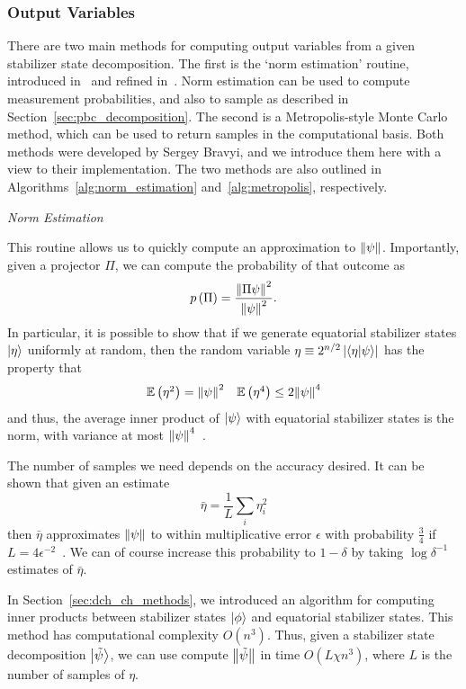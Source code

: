 \subsubsection*{Output Variables}
There are two main methods for computing output variables from a given stabilizer state decomposition. The first is the `norm estimation' routine, introduced in~\cite{Bravyi2016} and refined in~\cite{Bravyi2018}. Norm estimation can be used to compute measurement probabilities, and also to sample as described in Section~\ref{sec:pbc_decomposition}. The second is a Metropolis-style Monte Carlo method, which can be used to return samples in the computational basis. Both methods were developed by Sergey Bravyi, and we introduce them here with a view to their implementation. The two methods are also outlined in Algorithms~\ref{alg:norm_estimation} and~\ref{alg:metropolis}, respectively.\par
\large{\itshape{Norm Estimation}}\par
This routine allows us to quickly compute an approximation to $\norm{\psi}$. Importantly, given a projector $\Pi$, we can compute the probability of that outcome as
\begin{equation}
p\left(\Pi\right) = \frac{\norm{\Pi \psi}^{2}}{\norm{\psi}^{2}}.
\end{equation}
In particular, it is possible to show that if we generate equatorial stabilizer states $\ket{\eta}$ uniformly at random, then the random variable $\eta\equiv 2^{n/2}\left|\braket{\eta}{\psi}\right|$ has the property that
\[
\begin{array}{l r}
\mathbb{E}\left(\eta^{2}\right) = \norm{\psi}^{2} & \mathbb{E}\left(\eta^{4}\right) \leq 2\norm{\psi}^{4}
\end{array}
\]
and thus, the average inner product of $\ket{\psi}$ with equatorial stabilizer states is the norm, with variance at most $\norm{\psi}^{4}$~\cite{Bravyi2018}.\par
The number of samples we need depends on the accuracy desired. It can be shown that given an estimate 
\[\bar{\eta}=\frac{1}{L}\sum_{i}\eta_{i}^{2}\]
then $\bar{\eta}$ approximates $\norm{\psi}$ to within multiplicative error $\epsilon$ with probability $\frac{3}{4}$ if $L=4\epsilon^{-2}$~\cite{Bravyi2018}. We can of course increase this probability to $1-\delta$ by taking $\log{\delta^{-1}}$ estimates of $\bar{\eta}$.\par
In Section~\ref{sec:dch_ch_methods}, we introduced an algorithm for computing inner products between stabilizer states $\ket{\phi}$ and equatorial stabilizer states. This method has computational complexity $O(n^{3})$. Thus, given a stabilizer state decomposition $\ket{\tilde{\psi}}$, we can use compute $\norm{\tilde{\psi}}$ in time $O(L\chi n^{3})$, where $L$ is the number of samples of $\eta$.\par
